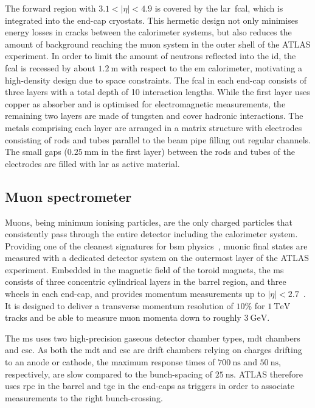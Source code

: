 The forward region with $3.1 < \vert\eta\vert <4.9$ is covered by the \gls{lar}~\gls{fcal}, which is integrated into the end-cap cryostats. This hermetic design not only minimises energy losses in cracks between the calorimeter systems, but also reduces the amount of background reaching the muon system in the outer shell of the ATLAS experiment. In order to limit the amount of neutrons reflected into the \gls{id}, the \gls{fcal} is recessed by about $\SI{1.2}{\meter}$ with respect to the \gls{em} calorimeter, motivating a high-density design due to space constraints. The \gls{fcal} in each end-cap consists of three layers with a total depth of 10 interaction lengths. While the first layer uses copper as absorber and is optimised for electromagnetic measurements, the remaining two layers are made of tungsten and cover hadronic interactions. The metals comprising each layer are arranged in a matrix structure with electrodes consisting of rods and tubes parallel to the beam pipe filling out regular channels. The small gaps ($\SI{0.25}{\milli\meter}$ in the first layer) between the rods and tubes of the electrodes are filled with \gls{lar} as active material.

\subsection{Muon spectrometer}

Muons, being minimum ionising particles, are the only charged particles that consistently pass through the entire detector including the calorimeter system. Providing one of the cleanest signatures for \gls{bsm} physics~\cite{Brock:1354959}, muonic final states are measured with a dedicated detector system on the outermost layer of the ATLAS experiment. Embedded in the magnetic field of the toroid magnets, the \gls{ms} consists of three concentric cylindrical layers in the barrel region, and three wheels in each end-cap, and provides momentum measurements up to $\vert\eta\vert <2.7$~\cite{Aad:2008zzm}. It is designed to deliver a transverse momentum resolution of $10\%$ for $\SI{1}{\TeV}$ tracks and be able to measure muon momenta down to roughly $\SI{3}{\GeV}$.

The \gls{ms} uses two high-precision gaseous detector chamber types, \gls{mdt} chambers and \gls{csc}. As both the \gls{mdt} and \gls{csc} are drift chambers relying on charges drifting to an anode or cathode, the maximum response times of $\SI{700}{\nano\second}$ and $\SI{50}{\nano\second}$, respectively, are slow compared to the bunch-spacing of $\SI{25}{\nano\second}$. ATLAS therefore uses \gls{rpc} in the barrel and \gls{tgc} in the end-caps as triggers in order to associate measurements to the right bunch-crossing.  

